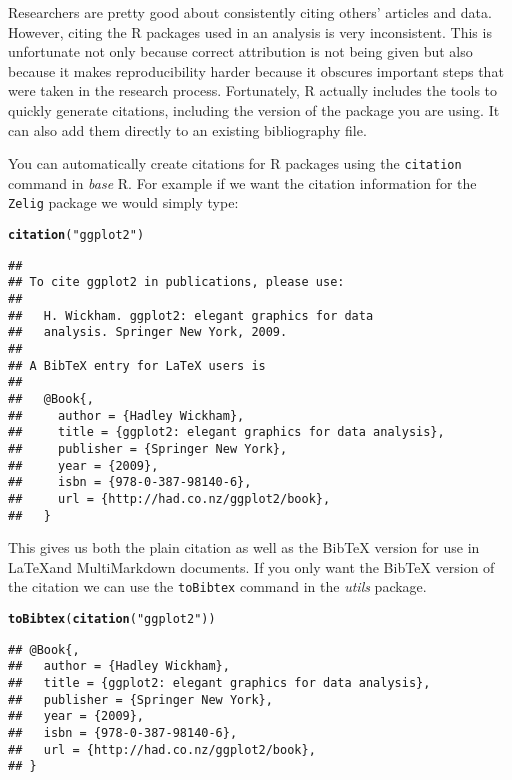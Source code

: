 \documentclass[ChapterTOCs,krantz1]{krantz}\usepackage{graphicx, color}
\makeatletter
\newcommand{\hlfunctioncall}[1]{\textcolor[rgb]{0.501960784313725,0,0.329411764705882}{\textbf{#1}}}%
\newcommand{\hlstring}[1]{\textcolor[rgb]{0.6,0.6,1}{#1}}%
\newenvironment{kframe}{%
 \def\at@end@of@kframe{}%
 \ifinner\ifhmode%
  \def\at@end@of@kframe{\end{minipage}}%
  \begin{minipage}{\columnwidth}%
 \fi\fi%
 \def\FrameCommand##1{\hskip\@totalleftmargin \hskip-\fboxsep
 \colorbox{shadecolor}{##1}\hskip-\fboxsep
     \hskip-\linewidth \hskip-\@totalleftmargin \hskip\columnwidth}%
 \MakeFramed {\advance\hsize-\width
   \@totalleftmargin\z@ \linewidth\hsize
   \@setminipage}}%
 {\par\unskip\endMakeFramed%
 \at@end@of@kframe}
\newenvironment{knitrout}{}{} %
\makeatother
\begin{document}
Researchers are pretty good about consistently citing others' articles and data. However, citing the R packages used in an analysis is very inconsistent. This is unfortunate not only because correct attribution is not being given but also because it makes reproducibility harder because it obscures important steps that were taken in the
research process. Fortunately, R actually includes the tools to quickly generate citations, including the version of the package you are using. It can also add them directly to an existing bibliography file.

You can automatically create citations for R packages using the \texttt{citation} command in \emph{base} R. For example if we want the citation information for the \texttt{Zelig} package we would simply type:

\begin{knitrout}
\color{fgcolor}\begin{kframe}
\begin{alltt}
\hlfunctioncall{citation}(\hlstring{"ggplot2"})
\end{alltt}
\begin{verbatim}
## 
## To cite ggplot2 in publications, please use:
## 
##   H. Wickham. ggplot2: elegant graphics for data
##   analysis. Springer New York, 2009.
## 
## A BibTeX entry for LaTeX users is
## 
##   @Book{,
##     author = {Hadley Wickham},
##     title = {ggplot2: elegant graphics for data analysis},
##     publisher = {Springer New York},
##     year = {2009},
##     isbn = {978-0-387-98140-6},
##     url = {http://had.co.nz/ggplot2/book},
##   }
\end{verbatim}
\end{kframe}
\end{knitrout}


\noindent This gives us both the plain citation as well as the BibTeX version for use in \LaTeX and MultiMarkdown documents. If you only want the BibTeX version of the citation we can use the \texttt{toBibtex} command in the \emph{utils} package.

\begin{knitrout}
\color{fgcolor}\begin{kframe}
\begin{alltt}
\hlfunctioncall{toBibtex}(\hlfunctioncall{citation}(\hlstring{"ggplot2"}))
\end{alltt}
\begin{verbatim}
## @Book{,
##   author = {Hadley Wickham},
##   title = {ggplot2: elegant graphics for data analysis},
##   publisher = {Springer New York},
##   year = {2009},
##   isbn = {978-0-387-98140-6},
##   url = {http://had.co.nz/ggplot2/book},
## }
\end{verbatim}
\end{kframe}
\end{knitrout}
\end{document}
